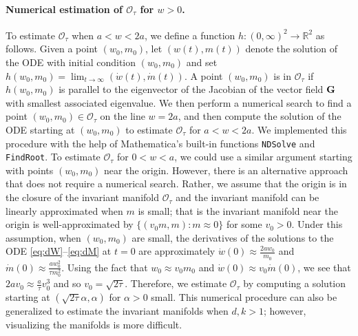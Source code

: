 \documentclass[11pt]{article}
\theoremstyle{definition}
\newcommand{\G}{{\bf G}}
\newcommand{\R}{\mathbb{R}}
\newcommand{\calO}{\mathcal{O}}
\begin{document}
\paragraph{Numerical estimation of $\calO_\tau$ for $w>0$.} To estimate $\calO_\tau$ when $a<w<2a$, we define a function $h:(0,\infty)^2\to\R^2$ as follows. Given a point $(w_0,m_0)$, let $(w(t),m(t))$ denote the solution of the ODE with initial condition $(w_0,m_0)$ and set $h(w_0,m_0)=\lim_{t\to\infty}(\dot{w}(t),\dot{m}(t))$. A point $(w_0,m_0)$ is in $\calO_\tau$ if $h(w_0,m_0)$ is parallel to the eigenvector of the Jacobian of the vector field $\G$ with smallest associated eigenvalue. We then perform a numerical search to find a point $(w_0,m_0)\in\calO_\tau$ on the line $w=2a$, and then compute the solution of the ODE starting at $(w_0,m_0)$ to estimate $\calO_\tau$ for $a<w<2a$. We implemented this procedure with the help of Mathematica's built-in functions \texttt{NDSolve} and \texttt{FindRoot}. To estimate $\calO_\tau$ for $0<w<a$, we could use a similar argument starting with points $(w_0,m_0)$ near the origin.
However, there is an alternative approach that does not require a numerical search. 
Rather, we assume that the origin is in the closure of the invariant manifold $\calO_\tau$ and the invariant manifold can be linearly approximated when $m$ is small; that is the invariant manifold near the origin is well-approximated by $\{(v_0m,m):m\approx 0\}$ for some $v_0>0$. Under this assumption, when $(w_0,m_0)$ are small, the derivatives of the solutions to the ODE \eqref{eq:dW}--\eqref{eq:dM} at $t=0$ are approximately $\dot w(0)\approx \frac{2aw_0}{m_0}$ and $\dot m(0)\approx \frac{aw_0^2}{\tau m_0^2}$. Using the fact that $w_0\approx v_0m_0$ and $\dot w(0)\approx v_0\dot m(0)$, we see that $2av_0\approx\frac{a}{\tau}v_0^3$ and so $v_0=\sqrt{2\tau}$. Therefore, we estimate $\calO_\tau$ by computing a solution starting at $(\sqrt{2\tau}\alpha,\alpha)$ for $\alpha>0$ small.
This numerical procedure can also be generalized to estimate the invariant manifolds when $d,k>1$; however, visualizing the manifolds is more difficult.



\end{document}
